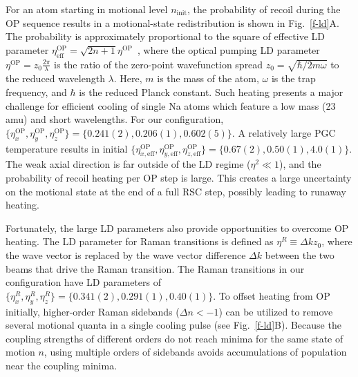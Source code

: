 \documentclass[aps,prl,twocolumn,groupedaddress]{revtex4-1}
\begin{document}
For an atom starting in motional level $n_{\textrm{init}}$, the probability of recoil during the OP sequence results in
a motional-state redistribution  is shown in Fig.~\ref{f-ld}A.
The  probability is approximately proportional to the square of effective LD parameter
$\eta^{\textrm{OP}}_{\textrm{eff}}=\sqrt{2n+1}\eta^{\textrm{OP}}$~\cite{Kaufman2012},
where the optical pumping LD parameter $\eta^{\textrm{OP}} = z_0\frac{2\pi}{\lambda}$ is the ratio of the zero-point wavefunction spread $z_0 = \sqrt{\hbar/2m\omega}$ to the reduced wavelength $\lambda$.
Here, $m$ is the mass of the atom, $\omega$ is the trap frequency,
and $\hbar$ is the reduced Planck constant.
Such heating presents a major challenge for efficient cooling of single Na atoms
which feature a low mass (23 amu) and short wavelengths.
For our configuration, 
$\{\eta^{\textrm{OP}}_x,\eta^{\textrm{OP}}_y,\eta^{\textrm{OP}}_z\} = \{0.241(2), 0.206(1), 0.602(5)\}$.
A relatively large PGC temperature results in initial $\{\eta^{\textrm{OP}}_{x,\textrm{eff}},\eta^{\textrm{OP}}_{y,\textrm{eff}},\eta^{\textrm{OP}}_{z,\textrm{eff}}\} = \{0.67(2), 0.50(1), 4.0(1)\}$.
The weak axial direction %
is far outside of the LD regime ($\eta^2\ll 1$), and the probability of recoil heating per OP step is large. %
This creates a large uncertainty on the motional state at the end of a full RSC step, possibly leading to runaway heating.

Fortunately, the large LD parameters also provide opportunities to overcome OP heating.
The LD parameter for Raman transitions is defined as $\eta^R\equiv\Delta k z_0$,
where the wave vector is replaced by the wave vector difference $\Delta k$
between the two beams that drive the Raman transition.
The Raman transitions in our configuration have LD parameters of
$\{\eta^R_x,\eta^R_y,\eta^R_z\} = \{0.341(2), 0.291(1), 0.40(1)\}$.
To offset heating from OP initially, higher-order Raman  sidebands ($\Delta n <-1$)  can be utilized
to remove several motional quanta in a single cooling pulse (see Fig.~\ref{f-ld}B).
Because the coupling strengths of different orders do not reach minima for the same state of motion $n$,
using multiple orders of sidebands avoids accumulations of population
near the coupling minima.
\end{document}
